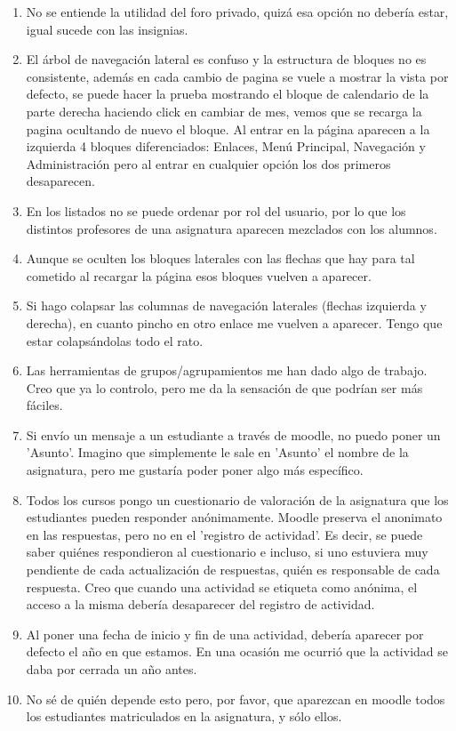 \begin{enumerate}
\item No se entiende la utilidad del foro privado, quizá esa opción no debería estar, igual sucede con las insignias.

\item El árbol de navegación lateral es confuso y la estructura de bloques no es consistente, además en cada cambio de pagina se vuele a mostrar la vista por defecto, se puede hacer la prueba mostrando el bloque de calendario de la parte derecha haciendo click en cambiar de mes, vemos que se recarga la pagina ocultando de nuevo el bloque. Al entrar en la página aparecen a la izquierda 4 bloques diferenciados: Enlaces, Menú Principal, Navegación y Administración pero al entrar en cualquier opción los dos primeros desaparecen.

\item En los listados no se puede ordenar por rol del usuario, por lo que los distintos profesores de una asignatura aparecen mezclados con los alumnos.

\item Aunque se oculten los bloques laterales con las flechas que hay para tal cometido al recargar la página esos bloques vuelven a aparecer.


\item Si hago colapsar las columnas de navegación laterales (flechas izquierda y derecha), en cuanto pincho en otro enlace me vuelven a aparecer. Tengo que estar colapsándolas todo el rato.

\item Las herramientas de grupos/agrupamientos me han dado algo de trabajo. Creo que ya lo controlo, pero me da la sensación de que podrían ser más fáciles.
\item Si envío un mensaje a un estudiante a través de moodle, no puedo poner un 'Asunto'. Imagino que simplemente le sale en 'Asunto' el nombre de la asignatura, pero me gustaría poder poner algo más específico.
\item Todos los cursos pongo un cuestionario de valoración de la asignatura que los estudiantes pueden responder anónimamente. Moodle preserva el anonimato en las respuestas, pero no en el 'registro de actividad'. Es decir, se puede saber quiénes respondieron al cuestionario e incluso, si uno estuviera muy pendiente de cada actualización de respuestas, quién es responsable de cada respuesta. Creo que cuando una actividad se etiqueta como anónima, el acceso a la misma debería desaparecer del registro de actividad.
\item Al poner una fecha de inicio y fin de una actividad, debería aparecer por defecto el año en que estamos. En una ocasión me ocurrió que la actividad se daba por cerrada un año antes.
\item No sé de quién depende esto pero, por favor, que aparezcan en moodle todos los estudiantes matriculados en la asignatura, y sólo ellos.


\end{enumerate}
